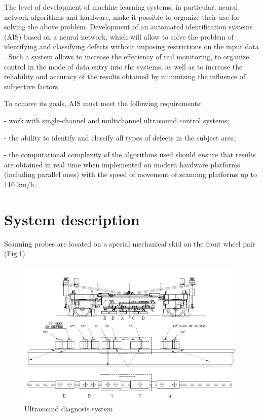 \documentclass[a4paper, 12pt]{article}
\begin{document}
The level of development of machine learning systems, in particular, neural network algorithms and hardware, make it possible to organize their use for solving the above problem. Development of an automated identification systems (AIS) based on a neural network, which will allow to solve the problem of identifying and classifying defects without imposing restrictions on the input data \cite{Bettayeb2008}. Such a system allows to increase the effeciency of rail monitoring, to organize control in the mode of data entry into the systems, as well as to increase the reliability and accuracy of the results obtained by minimizing the influence of subjective factors.

To achieve its goals, AIS must meet the following requirements:

- work with single-channel and multichannel ultrasound control systems;

- the ability to identify and classify all types of defects in the subject area;

- the computational complexity of the algorithms used should ensure that results are obtained in real time when implemented on modern hardware platforms (including parallel ones) with the speed of movement of scanning platforms up to 110 km/h.

\section{System description}

Scanning probes are located on a special mechanical skid on the front wheel pair (Fig.1)

\begin{figure}[h]
	\includegraphics[width=\linewidth]{fig1}
	\caption{Ultrasound diagnosis system}
\end{figure}
\end{document}
